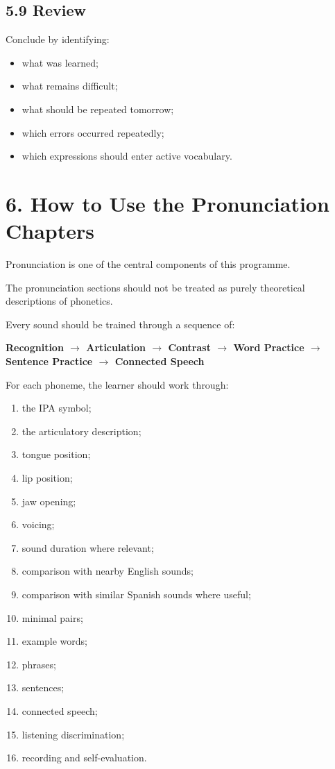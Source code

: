 \subsection*{5.9 Review}

Conclude by identifying:

\begin{itemize}
    \item what was learned;
    \item what remains difficult;
    \item what should be repeated tomorrow;
    \item which errors occurred repeatedly;
    \item which expressions should enter active vocabulary.
\end{itemize}

\section*{6. How to Use the Pronunciation Chapters}

Pronunciation is one of the central components of this programme.

The pronunciation sections should not be treated as purely theoretical descriptions of phonetics.

Every sound should be trained through a sequence of:

\begin{center}
\textbf{Recognition $\rightarrow$ Articulation $\rightarrow$ Contrast $\rightarrow$ Word Practice $\rightarrow$ Sentence Practice $\rightarrow$ Connected Speech}
\end{center}

For each phoneme, the learner should work through:

\begin{enumerate}
    \item the IPA symbol;
    \item the articulatory description;
    \item tongue position;
    \item lip position;
    \item jaw opening;
    \item voicing;
    \item sound duration where relevant;
    \item comparison with nearby English sounds;
    \item comparison with similar Spanish sounds where useful;
    \item minimal pairs;
    \item example words;
    \item phrases;
    \item sentences;
    \item connected speech;
    \item listening discrimination;
    \item recording and self-evaluation.
\end{enumerate}

